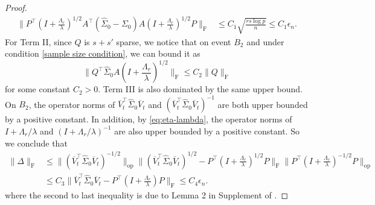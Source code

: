 \documentclass[11pt]{article}
\newcommand{\nb}[1]{\textcolor{orange}{\texttt{[#1]}}}
\newcommand{\gd}{\overline{V}}
\newcommand{\so}{\widehat{\Sigma}_0}
\newcommand{\0}{{\mathbf{0}}}
\newcommand{\op}{{\mathrm{op}}}
\newcommand{\szerothird}{{\widehat{\Sigma}_0}}
\begin{document}
\begin{proof}
\begin{align*}
\|P^\top  (I+\frac{\Lambda_r}{\lambda})^{1/2}A^\top  (\szerothird-\Sigma_0) A(I+\frac{\Lambda_r}{\lambda})^{1/2}P\|_\mathrm{F}
& \leq C_1\sqrt{\frac{rs \log p }{n}} \leq C_1 \epsilon_n.
\end{align*} 
For Term II, since $Q$ is $s+s'$ sparse, 
we notice that on event $B_2$ and under condition \eqref{sample size condition}, we can bound it as \begin{equation*}
\|Q^\top \szerothird A(I+\frac{\Lambda_r}{\lambda})^{1/2}\|_\mathrm{F}\leq C_2 \|Q\|_\mathrm{F}
\end{equation*}
for some constant $C_2>0$. Term III is also dominated by the same upper bound. 
On $B_2$, the operator norms of $\gd_t^\top\so\gd_t$ and $(\gd_t^\top\so\gd_t)^{-1}$ are both upper bounded by a positive constant.
In addition, by \eqref{eq:eta-lambda}, the operator norms of $I+{\Lambda_r}/{\lambda}$ and $(I+{\Lambda_r}/{\lambda})^{-1}$ are also upper bounded by a positive constant.
So we conclude that 
\begin{align*}
\|\Delta\|_\mathrm{F}
&\leq \|(\gd_t^\top\so\gd_t)^{-1/2}\|_\op\|(\gd_t^\top\so\gd_t)^{1/2}-P^\top(I+\frac{\Lambda_r}{\lambda})^{1/2}P\|_\mathrm{F}\|P^\top(I+\frac{\Lambda_r}{\lambda})^{-1/2}P\|_\op\\
&\leq C_3\|\gd_t^\top\so\gd_t-P^\top(I+\frac{\Lambda_r}{\lambda})P\|_\mathrm{F}\leq C_4\epsilon_n.
\end{align*}
where the second to last inequality is due to Lemma 2 in Supplement of \cite{gao2017sparse}. 


\end{proof}
\end{document}

